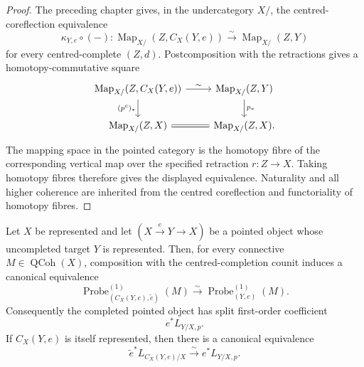 \begin{proof}
The preceding chapter gives, in the undercategory $X/$, the centred-coreflection
equivalence
\[
    \kappa_{Y,e}\circ(-):
    \operatorname{Map}_{X/}
    \left(
        Z,C_X(Y,e)
    \right)
    \xrightarrow{\sim}
    \operatorname{Map}_{X/}(Z,Y)
\]
for every centred-complete $(Z,d)$.  Postcomposition with the retractions gives
a homotopy-commutative square
\[
\begin{tikzcd}
\operatorname{Map}_{X/}(Z,C_X(Y,e))
  \arrow[r,"\sim"]
  \arrow[d,"{(p^c)_*}"'] &
\operatorname{Map}_{X/}(Z,Y)
  \arrow[d,"p_*"]\\
\operatorname{Map}_{X/}(Z,X)
  \arrow[r,equal] &
\operatorname{Map}_{X/}(Z,X).
\end{tikzcd}
\]
The mapping space in the pointed category is the homotopy fibre of the
corresponding vertical map over the specified retraction $r:Z\to X$.  Taking
homotopy fibres therefore gives the displayed equivalence.  Naturality and all
higher coherence are inherited from the centred coreflection and functoriality
of homotopy fibres.
\end{proof}

\begin{theorem}
\label{thm:bnla-first-probe-centred-completion}
Let $X$ be represented and let $(X\xrightarrow{e}Y\to X)$ be a pointed object
whose uncompleted target $Y$ is represented.  Then, for every connective
$M\in\operatorname{QCoh}(X)$, composition with the centred-completion counit
induces a canonical equivalence
\[
    \operatorname{Probe}^{(1)}_{(C_X(Y,e),\widetilde e)}(M)
    \xrightarrow{\sim}
    \operatorname{Probe}^{(1)}_{(Y,e)}(M).
\]
Consequently the completed pointed object has split first-order coefficient
\[
    e^*L_{Y/X,p}.
\]
If $C_X(Y,e)$ is itself represented, then there is a canonical equivalence
\[
    \widetilde e^*L_{C_X(Y,e)/X}
    \xrightarrow{\sim}
    e^*L_{Y/X,p}.
\]
\end{theorem}

